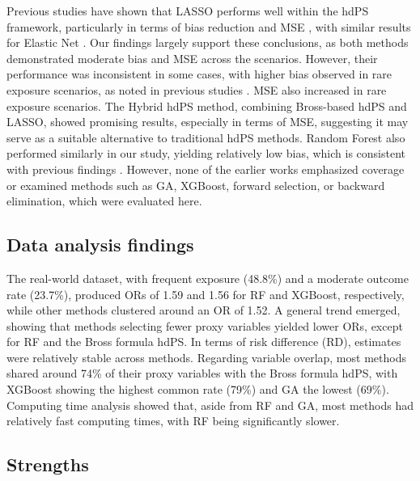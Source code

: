\documentclass[sn-vancouver,Numbered,lineno,pdflatex]{sn-jnl}
\begin{document}
Previous studies have shown that LASSO performs well within the hdPS
framework, particularly in terms of bias reduction and MSE
\citep{karim2018can, franklin2015regularized}, with similar results for
Elastic Net \citep{karim2018can}. Our findings largely support these
conclusions, as both methods demonstrated moderate bias and MSE across
the scenarios. However, their performance was inconsistent in some
cases, with higher bias observed in rare exposure scenarios, as noted in
previous studies \citep{karim2018can, franklin2015regularized}. MSE also
increased in rare exposure scenarios. The Hybrid hdPS method, combining
Bross-based hdPS and LASSO, showed promising results, especially in
terms of MSE, suggesting it may serve as a suitable alternative to
traditional hdPS methods. Random Forest also performed similarly in our
study, yielding relatively low bias, which is consistent with previous
findings \citep{karim2018can}. However, none of the earlier works
emphasized coverage or examined methods such as GA, XGBoost, forward
selection, or backward elimination, which were evaluated here.

\subsection{Data analysis findings}\label{data-analysis-findings}

The real-world dataset, with frequent exposure (48.8\%) and a moderate
outcome rate (23.7\%), produced ORs of 1.59 and 1.56 for RF and XGBoost,
respectively, while other methods clustered around an OR of 1.52. A
general trend emerged, showing that methods selecting fewer proxy
variables yielded lower ORs, except for RF and the Bross formula hdPS.
In terms of risk difference (RD), estimates were relatively stable
across methods. Regarding variable overlap, most methods shared around
74\% of their proxy variables with the Bross formula hdPS, with XGBoost
showing the highest common rate (79\%) and GA the lowest (69\%).
Computing time analysis showed that, aside from RF and GA, most methods
had relatively fast computing times, with RF being significantly slower.

\subsection{Strengths}\label{strengths}
\end{document}

